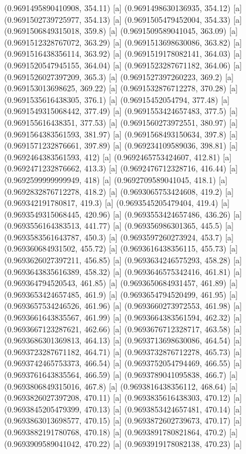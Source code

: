 {{{(0.9691495890410908, 354.11) [a] 
(0.9691498630136935, 354.12) [a] 
(0.9691502739725977, 354.13) [a] 
(0.9691505479452004, 354.33) [a] 
(0.9691506849315018, 359.8) [a] 
(0.9691509589041045, 363.09) [a] 
(0.9691512328767072, 363.29) [a] 
(0.9691513698630086, 363.82) [a] 
(0.9691516438356114, 363.92) [a] 
(0.9691519178082141, 364.03) [a] 
(0.9691520547945155, 364.04) [a] 
(0.9691523287671182, 364.06) [a] 
(0.9691526027397209, 365.3) [a] 
(0.9691527397260223, 369.2) [a] 
(0.969153013698625, 369.22) [a] 
(0.9691532876712278, 370.28) [a] 
(0.9691535616438305, 376.1) [a] 
(0.96915452054794, 377.48) [a] 
(0.9691549315068442, 377.49) [a] 
(0.9691553424657483, 377.5) [a] 
(0.969155616438351, 377.53) [a] 
(0.9691560273972551, 380.97) [a] 
(0.9691564383561593, 381.97) [a] 
(0.9691568493150634, 397.8) [a] 
(0.9691571232876661, 397.89) [a] 
(0.969234109589036, 398.81) [a] 
(0.9692464383561593, 412) [a] 
(0.9692465753424607, 412.81) [a] 
(0.9692471232876662, 413.3) [a] 
(0.9692476712328716, 416.44) [a] 
(0.9692599999999949, 418) [a] 
(0.9692709589041045, 418.1) [a] 
(0.9692832876712278, 418.2) [a] 
(0.9693065753424608, 419.2) [a] 
(0.969342191780817, 419.3) [a] 
(0.9693545205479404, 419.4) [a] 
(0.9693549315068445, 420.96) [a] 
(0.9693553424657486, 436.26) [a] 
(0.9693556164383513, 441.77) [a] 
(0.969356986301365, 445.5) [a] 
(0.9693583561643787, 450.3) [a] 
(0.9693597260273924, 453.7) [a] 
(0.969360684931502, 455.72) [a] 
(0.9693616438356115, 455.73) [a] 
(0.9693626027397211, 456.85) [a] 
(0.9693634246575293, 458.28) [a] 
(0.9693643835616389, 458.32) [a] 
(0.9693646575342416, 461.81) [a] 
(0.969364794520543, 461.85) [a] 
(0.9693650684931457, 461.89) [a] 
(0.9693653424657485, 461.9) [a] 
(0.9693654794520499, 461.95) [a] 
(0.9693657534246526, 461.96) [a] 
(0.9693660273972553, 461.98) [a] 
(0.9693661643835567, 461.99) [a] 
(0.9693664383561594, 462.32) [a] 
(0.9693667123287621, 462.66) [a] 
(0.9693676712328717, 463.58) [a] 
(0.9693686301369813, 464.13) [a] 
(0.9693713698630086, 464.54) [a] 
(0.9693723287671182, 464.71) [a] 
(0.9693732876712278, 465.73) [a] 
(0.9693742465753373, 466.54) [a] 
(0.9693752054794469, 466.55) [a] 
(0.9693761643835564, 466.59) [a] 
(0.9693789041095838, 466.7) [a] 
(0.9693806849315016, 467.8) [a] 
(0.9693816438356112, 468.64) [a] 
(0.9693826027397208, 470.11) [a] 
(0.9693835616438303, 470.12) [a] 
(0.9693845205479399, 470.13) [a] 
(0.9693853424657481, 470.14) [a] 
(0.9693863013698577, 470.15) [a] 
(0.9693872602739673, 470.17) [a] 
(0.9693882191780768, 470.18) [a] 
(0.9693891780821864, 470.2) [a] 
(0.9693909589041042, 470.22) [a] 
(0.9693919178082138, 470.23) [a] 
}}}
